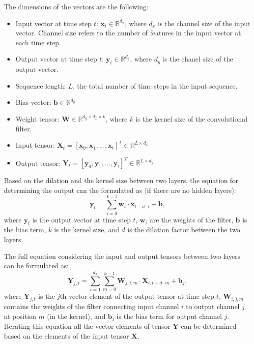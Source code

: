 The dimensions of the vectors are the following:
\begin{itemize}
    \item Input vector at time step $t$: $\mathbf{x}_t \in \mathbb{R}^{d_x}$, where $d_x$ is the channel size of the input vector. Channel size refers to the number of features in the input vector at each time step.
    \item Output vector at time step $t$: $\mathbf{y}_t \in \mathbb{R}^{d_y}$, where $d_y$ is the chanel size of the output vector.
    \item Sequence length: $L$, the total number of time steps in the input sequence.
    \item Bias vector: $\mathbf{b} \in \mathbb{R}^{d_y}$
    \item Weight tensor: $\mathbf{W} \in \mathbb{R}^{d_y \times d_x \times k}$, where $k$ is the kernel size of the convolutional filter.
    \item Input tensor: $\mathbf{X}_t = [\mathbf{x}_0, \mathbf{x}_1, ..., \mathbf{x}_t]^T \in \mathbb{R}^{L \times d_x}$
    \item Output tensor: $\mathbf{Y}_t = [\mathbf{y}_0, \mathbf{y}_1, ..., \mathbf{y}_t]^T \in \mathbb{R}^{L \times d_y}$
\end{itemize}

Based on the dilation and the kernel size between two layers, the equation for determining the output can the formulated as (if there are no hidden layers):
\begin{equation}
    \mathbf{y}_t = \sum_{i=0}^{k-1} \mathbf{w}_i \cdot \mathbf{x}_{t - d \cdot i} + \mathbf{b},
\end{equation}
where $\mathbf{y}_t$ is the output vector at time step $t$, $\mathbf{w}_i$ are the weights of the filter, $\mathbf{b}$ is the bias term, $k$ is the kernel size, and $d$ is the dilation factor between the two layers.

The full equation considering the input and output tensors between two layers can be formulated as:
\begin{equation}
    \mathbf{Y}_{j, t} = \sum_{i=1}^{d_x} \sum_{m=0}^{k-1} \mathbf{W}_{j, i, m} \cdot \mathbf{X}_{i, t - d \cdot m} + \mathbf{b}_j,
\end{equation}
where $\mathbf{Y}_{j, t}$ is the $j$th vector element of the output tensor at time step $t$, $\mathbf{W}_{i, j, m}$ contains the weights of the filter connecting input channel $i$ to output channel $j$ at position $m$ (in the kernel), and $\mathbf{b}_j$ is the bias term for output channel $j$. Iterating this equation all the vector elements of tensor $\mathbf{Y}$ can be determined based on the elements of the input tensor $\mathbf{X}$. 

